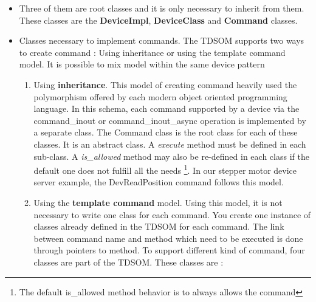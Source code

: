 \begin{itemize}
\item Three of them are root classes and it is only necessary to inherit
from them. These classes are the \textbf{DeviceImpl},
\textbf{DeviceClass} and \textbf{Command}
classes. 
\item Classes necessary to implement commands. The TDSOM
supports two ways to create command : Using inheritance
or using the template command model. It is possible
to mix model within the same device pattern

\begin{enumerate}
\item Using \textbf{inheritance}. This model of creating command heavily
used the polymorphism offered by each modern object oriented programming
language. In this schema, each command supported by a device via the
command\_inout or command\_inout\_async
operation is implemented by a separate class. The Command
class is the root class for each of these classes. It is an abstract
class. A \emph{execute} method must be defined in
each sub-class. A \emph{is\_allowed} method may
also be re-defined in each class if the default one does not fulfill
all the needs%
\footnote{The default is\_allowed method behavior is to always allows the command%
}. In our stepper motor device server example, the DevReadPosition
command follows this model.
\item Using the \textbf{template command} model. Using this model, it is
not necessary to write one class for each command. You create one
instance of classes already defined in the TDSOM for each command.
The link between command name and method which need to be executed
is done through pointers to method. To support different kind of command,
four classes are part of the TDSOM. These classes are :


\end{enumerate}
\end{itemize}
